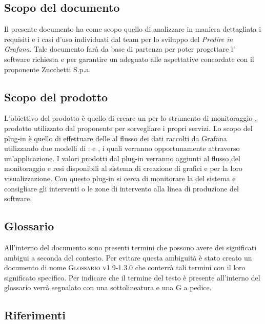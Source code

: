 \documentclass[../analisi-dei-requisiti.tex]{subfiles}
\begin{document}
\subsection{Scopo del documento}%
\label{subs:scopo_del_documento}
Il presente documento ha come scopo quello di analizzare in maniera dettagliata i requisiti e i casi d'uso individuati dal team per lo sviluppo del  \emph{Predire in Grafana}. Tale documento farà da base di partenza per poter progettare l' software richiesta e per garantire un  adeguato alle aspettative concordate con il proponente Zucchetti S.p.a.

\subsection{Scopo del prodotto}%
\label{subs:scopo_del_prodotto}
L'obiettivo del prodotto è quello di creare un  per lo strumento di monitoraggio , prodotto utilizzato dal proponente per sorvegliare i propri servizi. Lo scopo del plug-in è quello di effettuare delle  al flusso dei dati raccolti da Grafana utilizzando due modelli di :  e , i quali verranno opportunamente  attraverso un'applicazione. I valori prodotti dal plug-in verranno aggiunti al flusso del monitoraggio e resi disponibili al sistema di creazione di grafici e  per la loro visualizzazione. Con questo plug-in si cerca di monitorare la  del sistema e consigliare gli interventi o le zone di intervento alla linea di produzione del software.

\subsection{Glossario}
\label{subs:glossario}
All'interno del documento sono presenti termini che possono avere dei significati ambigui a seconda del contesto. Per evitare questa ambiguità è stato creato un documento di nome \textsc{Glossario v1.9-1.3.0} che conterrà tali termini con il loro significato specifico. Per indicare che il termine del testo è presente all'interno del glossario verrà segnalato con una sottolineatura e una G a pedice.

\subsection{Riferimenti}
\label{subs:riferimenti}
\end{document}
